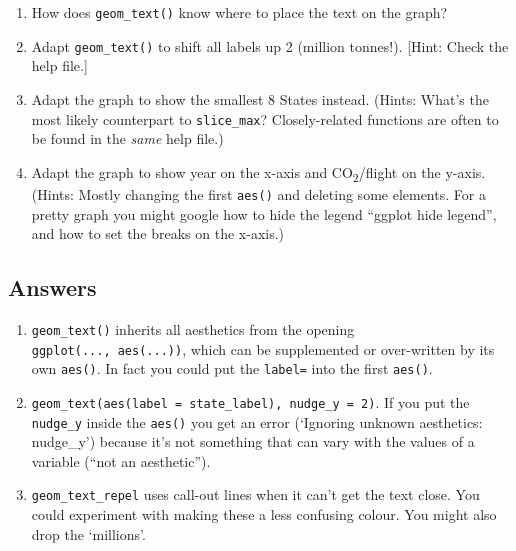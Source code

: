\documentclass[
]{book}
\providecommand{\tightlist}{%
  \setlength{\itemsep}{0pt}\setlength{\parskip}{0pt}}
\begin{document}
\begin{enumerate}
\def\labelenumi{\arabic{enumi})}
\tightlist
\item
  How does \texttt{geom\_text()} know where to place the text on the graph?
\item
  Adapt \texttt{geom\_text()} to shift all labels up 2 (million tonnes!). {[}Hint: Check the help file.{]}
\item
  Adapt the graph to show the smallest 8 States instead. (Hints: What's the most likely counterpart to \texttt{slice\_max}? Closely-related functions are often to be found in the \emph{same} help file.)
\item
  Adapt the graph to show year on the x-axis and CO\textsubscript{2}/flight on the y-axis. (Hints: Mostly changing the first \texttt{aes()} and deleting some elements. For a pretty graph you might google how to hide the legend ``ggplot hide legend'', and how to set the breaks on the x-axis.)
\end{enumerate}

\hypertarget{answers-2}{%
\subsection{Answers}\label{answers-2}}

\begin{enumerate}
\def\labelenumi{\arabic{enumi})}
\tightlist
\item
  \texttt{geom\_text()} inherits all aesthetics from the opening \texttt{ggplot(...,\ aes(...))}, which can be supplemented or over-written by its own \texttt{aes()}. In fact you could put the \texttt{label=} into the first \texttt{aes()}.
\item
  \texttt{geom\_text(aes(label\ =\ state\_label),\ nudge\_y\ =\ 2)}. If you put the \texttt{nudge\_y} inside the \texttt{aes()} you get an error (`Ignoring unknown aesthetics: nudge\_y') because it's not something that can vary with the values of a variable (``not an aesthetic'').
\item
  \texttt{geom\_text\_repel} uses call-out lines when it can't get the text close. You could experiment with making these a less confusing colour. You might also drop the `millions'.
\end{enumerate}
\end{document}
